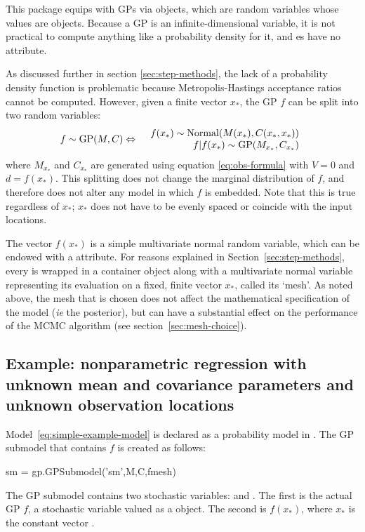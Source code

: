 \documentclass[article]{jss}
\begin{document}
This package equips  with GPs via  objects, which are random variables whose values are  objects. Because a GP is an infinite-dimensional variable, it is not practical to compute anything like a probability density for it, and es have no  attribute.

As discussed further in section \ref{sec:step-methods}, the lack of a probability density function is problematic because Metropolis-Hastings acceptance ratios cannot be computed. However, given a finite vector $x_*$, the GP $f$ can be split into two random variables:
\begin{eqnarray*}
    f\sim\textup{GP}(M,C) & \Leftrightarrow & \begin{array}{r}
        f(x_*)\sim\textup{Normal}(M(x_*), C(x_*,x_*))\\
        f|f(x_*)\sim\textup{GP}(M_{x_*}, C_{x_*})
    \end{array}
\end{eqnarray*}
where $M_{x_*}$ and $C_{x_*}$ are generated using equation \ref{eq:obs-formula} with $V=0$ and $d=f(x_*)$. This splitting does not change the marginal distribution of $f$, and therefore does not alter any model in which $f$ is embedded. Note that this is true regardless of $x_*$; $x_*$ does not have to be evenly spaced or coincide with the input locations.

The vector $f(x_*)$ is a simple multivariate normal random variable, which can be endowed with a  attribute. For reasons explained in Section~\ref{sec:step-methods}, every  is wrapped in a  container object along with a multivariate normal variable representing its evaluation on a fixed, finite vector $x_*$, called its `mesh'. As noted above, the mesh that is chosen does not affect the mathematical specification of the model (\emph{ie} the posterior), but can have a substantial effect on the performance of the MCMC algorithm (see section~\ref{sec:mesh-choice}).  

\subsection{Example: nonparametric regression with unknown mean and covariance parameters and unknown observation locations}\label{sub:BasicMCMC}

Model~\ref{eq:simple-example-model} is declared as a  probability model in . The GP submodel that contains $f$ is created as follows:
\begin{CodeChunk}
\begin{CodeInput}
sm = gp.GPSubmodel('sm',M,C,fmesh)
\end{CodeInput}
\end{CodeChunk}
The GP submodel contains two stochastic variables:  and . The first is the actual GP $f$, a stochastic variable valued as a  object. The second is $f(x_*)$, where $x_*$ is the constant vector .
\end{document}
